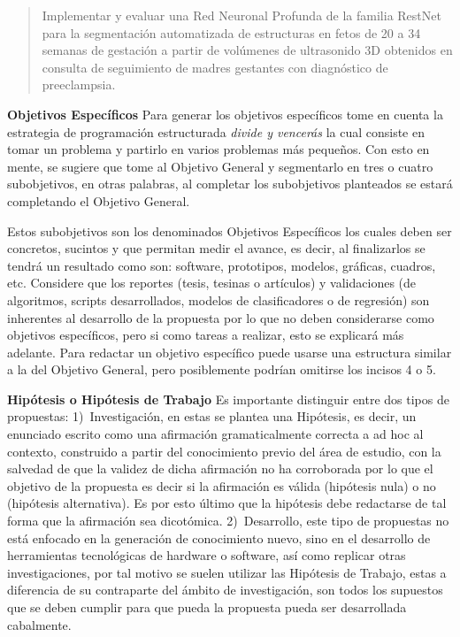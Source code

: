 \begin{quote}
Implementar y evaluar una Red Neuronal Profunda de la familia RestNet para la segmentación automatizada de estructuras en fetos de 20 a 34 semanas de gestación a partir de volúmenes de ultrasonido 3D obtenidos en consulta de seguimiento de madres gestantes con diagnóstico de preeclampsia.
\end{quote}

\textbf{Objetivos Específicos}
Para generar los objetivos específicos tome en cuenta la estrategia de programación estructurada \textit{divide y vencerás} la cual consiste en tomar un problema y partirlo en varios problemas más pequeños. Con esto en mente, se sugiere que tome al Objetivo General y segmentarlo en tres o cuatro subobjetivos, en otras palabras, al completar los subobjetivos planteados se estará completando el Objetivo General.

Estos subobjetivos son los denominados Objetivos Específicos los cuales deben ser concretos, sucintos y que permitan medir el avance, es decir, al finalizarlos se tendrá un resultado como son: software, prototipos, modelos, gráficas, cuadros, etc. Considere que los reportes (tesis, tesinas o artículos) y validaciones (de algoritmos, scripts desarrollados, modelos de clasificadores o de regresión) son inherentes al desarrollo de la propuesta por lo que no deben considerarse como objetivos específicos, pero si como tareas a realizar, esto se explicará más adelante. Para redactar un objetivo específico puede usarse una estructura similar a la del Objetivo General, pero posiblemente podrían omitirse los incisos 4 o 5.


\textbf{Hipótesis o Hipótesis de Trabajo}
Es importante distinguir entre dos tipos de propuestas: 1)~Investigación, en estas se plantea una Hipótesis, es decir, un enunciado escrito como una afirmación gramaticalmente correcta a ad hoc al contexto, construido a partir del conocimiento previo del área de estudio, con la salvedad de que la validez de dicha afirmación no ha corroborada por lo que el objetivo de la propuesta es decir si la afirmación es válida (hipótesis nula) o no (hipótesis alternativa). Es por esto último que la hipótesis debe redactarse de tal forma que la afirmación sea dicotómica. 2)~Desarrollo, este tipo de propuestas no está enfocado en la generación de conocimiento nuevo, sino en el desarrollo de herramientas tecnológicas de hardware o software, así como replicar otras investigaciones, por tal motivo se suelen utilizar las Hipótesis de Trabajo, estas a diferencia de su contraparte del ámbito de investigación, son todos los supuestos que se deben cumplir para que pueda la propuesta pueda ser desarrollada cabalmente.

